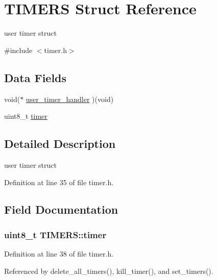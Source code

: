 \hypertarget{structTIMERS}{}\section{T\+I\+M\+E\+RS Struct Reference}
\label{structTIMERS}


user timer struct  




{\ttfamily \#include $<$timer.\+h$>$}

\subsection*{Data Fields}
\begin{DoxyCompactItemize}
\item 
void($\ast$ \hyperlink{structTIMERS_a4326e05ca52d80147efafd0d246ecb41}{user\+\_\+timer\+\_\+handler} )(void)
\item 
uint8\+\_\+t \hyperlink{structTIMERS_a0b10fdb7b0e6b1d3ca49718f47c4514d}{timer}
\end{DoxyCompactItemize}


\subsection{Detailed Description}
user timer struct 

Definition at line 35 of file timer.\+h.



\subsection{Field Documentation}
\subsubsection[{\texorpdfstring{timer}{timer}}]{\setlength{\rightskip}{0pt plus 5cm}uint8\+\_\+t T\+I\+M\+E\+R\+S\+::timer}\hypertarget{structTIMERS_a0b10fdb7b0e6b1d3ca49718f47c4514d}{}\label{structTIMERS_a0b10fdb7b0e6b1d3ca49718f47c4514d}


Definition at line 38 of file timer.\+h.



Referenced by delete\+\_\+all\+\_\+timers(), kill\+\_\+timer(), and set\+\_\+timers().

